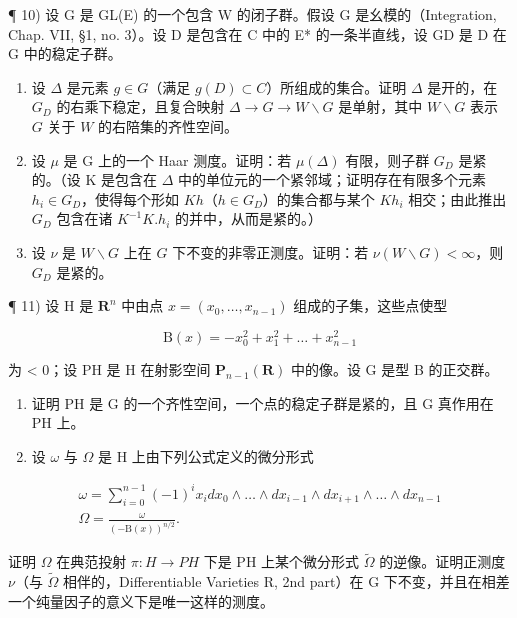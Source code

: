 ¶ 10) 设 G 是 GL(E) 的一个包含 W 的闭子群。假设 G 是幺模的（Integration, Chap. VII, §1, no. 3）。设 D 是包含在 C 中的 E* 的一条半直线，设 GD 是 D 在 G 中的稳定子群。

\begin{enumerate}
\def\labelenumi{\alph{enumi})}
\item
  设 \(\Delta\) 是元素 \(g \in G\)（满足 \(g(D) \subset C\)）所组成的集合。证明 \(\Delta\) 是开的，在 \(G_D\) 的右乘下稳定，且复合映射 \(\Delta \to G \to W \backslash G\) 是单射，其中 \(W \backslash G\) 表示 \(G\) 关于 \(W\) 的右陪集的齐性空间。
\item
  设 \(\mu\) 是 G 上的一个 Haar 测度。证明：若 \(\mu(\Delta)\) 有限，则子群 \(G_{D}\) 是紧的。（设 K 是包含在 \(\Delta\) 中的单位元的一个紧邻域；证明存在有限多个元素 \(h_i \in G_D\)，使得每个形如 \(Kh\)（\(h \in G_D\)）的集合都与某个 \(Kh_i\) 相交；由此推出 \(G_D\) 包含在诸 \(K^{-1}K.h_i\) 的并中，从而是紧的。）
\item
  设 \(\nu\) 是 \(W\backslash G\) 上在 \(G\) 下不变的非零正测度。证明：若 \(\nu(W\backslash G) < \infty\)，则 \(G_{D}\) 是紧的。
\end{enumerate}

¶ 11) 设 H 是 \(\mathbf{R}^n\) 中由点 \(x = (x_0, \ldots, x_{n-1})\) 组成的子集，这些点使型

\[
\mathrm{B} (x) = - x _ {0} ^ {2} + x _ {1} ^ {2} + \dots + x _ {n - 1} ^ {2}
\]

为 \textless{} 0；设 PH 是 H 在射影空间 \(\mathbf{P}_{n-1}(\mathbf{R})\) 中的像。设 G 是型 B 的正交群。

\begin{enumerate}
\def\labelenumi{\alph{enumi})}
\item
  证明 PH 是 G 的一个齐性空间，一个点的稳定子群是紧的，且 G 真作用在 PH 上。
\item
  设 \(\omega\) 与 \(\Omega\) 是 H 上由下列公式定义的微分形式
\end{enumerate}

\[
\begin{array}{c} \omega = \sum_ {i = 0} ^ {n - 1} (- 1) ^ {i} x _ {i} d x _ {0} \wedge \dots \wedge d x _ {i - 1} \wedge d x _ {i + 1} \wedge \dots \wedge d x _ {n - 1} \\ \Omega = \frac {\omega}{(- \mathrm{B} (x)) ^ {n / 2}}. \end{array}
\]

证明 \(\Omega\) 在典范投射 \(\pi:H\to PH\) 下是 PH 上某个微分形式 \(\tilde{\Omega}\) 的逆像。证明正测度 \(\nu\)（与 \(\tilde{\Omega}\) 相伴的，Differentiable Varieties R, 2nd part）在 G 下不变，并且在相差一个纯量因子的意义下是唯一这样的测度。

